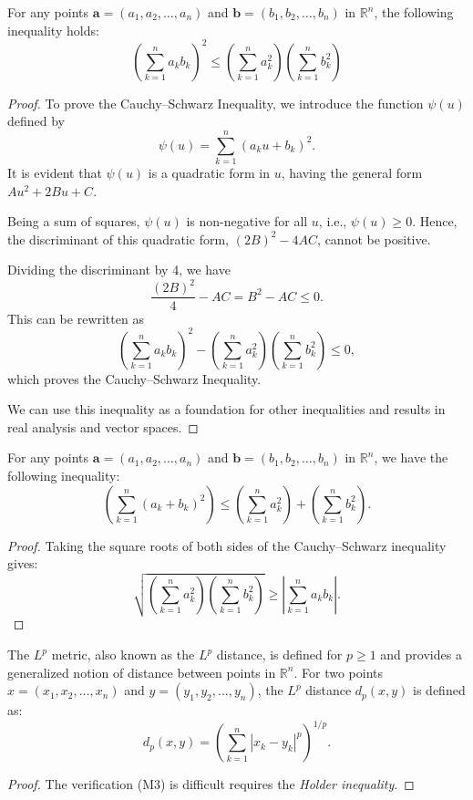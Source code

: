 \begin{theorem}
    For any points \( \mathbf{a} = (a_1, a_2, \ldots, a_n) \) and \( \mathbf{b} = (b_1, b_2, \ldots, b_n) \) in \( \mathbb{R}^n \), the following inequality holds:
    \[
    \left( \sum_{k=1}^{n} a_k b_k \right)^2 \leq \left( \sum_{k=1}^{n} a_k^2 \right) \left( \sum_{k=1}^{n} b_k^2 \right) 
    \]
\end{theorem}
\begin{proof}
    To prove the Cauchy--Schwarz Inequality, we introduce the function \( \psi(u) \) defined by
    \[
    \psi(u) = \sum_{k=1}^{n} \left(a_k u + b_k\right)^2.
    \]
    It is evident that \( \psi(u) \) is a quadratic form in \( u \), having the general form \( Au^2 + 2Bu + C \).
    
    Being a sum of squares, \( \psi(u) \) is non-negative for all \( u \), i.e., \( \psi(u) \geq 0 \). Hence, the discriminant of this quadratic form, \( (2B)^2 - 4AC \), cannot be positive. 
    
    Dividing the discriminant by 4, we have
    \[
    \frac{(2B)^2}{4} - AC = B^2 - AC \leq 0.
    \]
    This can be rewritten as
    \[
    \left(\sum_{k=1}^{n} a_k b_k\right)^2 - \left(\sum_{k=1}^{n} a_k^2\right)\left(\sum_{k=1}^{n} b_k^2\right) \leq 0,
    \]
    which proves the Cauchy--Schwarz Inequality.
    
    We can use this inequality as a foundation for other inequalities and results in real analysis and vector spaces.
    
\end{proof}

\begin{theorem}
    For any points \( \mathbf{a} = (a_1, a_2, \ldots, a_n) \) and \( \mathbf{b} = (b_1, b_2, \ldots, b_n) \) in \( \mathbb{R}^n \), we have the following inequality:
    \[
    \left( \sum_{k=1}^{n} (a_k + b_k)^2 \right) \leq \left( \sum_{k=1}^{n} a_k^2 \right) + \left( \sum_{k=1}^{n} b_k^2 \right).
    \]
\end{theorem}
\begin{proof}
    Taking the square roots of both sides of the Cauchy--Schwarz inequality gives:
    \[
    \sqrt{\left( \sum_{k=1}^{n} a_k^2 \right) \left( \sum_{k=1}^{n} b_k^2 \right)} \geq \left| \sum_{k=1}^{n} a_k b_k \right|.
    \]
\end{proof}

\begin{example}[$l^{p}$-metric on $\RR^n$]
    The \( L^p \) metric, also known as the \( L^p \) distance, is defined for \( p \geq 1 \) and provides a generalized notion of distance between points in \( \mathbb{R}^n \). For two points \( x = (x_1, x_2, \ldots, x_n) \) and \( y = (y_1, y_2, \ldots, y_n) \), the \( L^p \) distance \( d_p(x, y) \) is defined as:
    \[
    d_p(x, y) = \left( \sum_{k=1}^{n} |x_k - y_k|^p \right)^{1/p}.
    \]
\end{example}
\begin{proof}
    The verification (M3) is difficult requires the \textit{Holder inequality}.
\end{proof}

